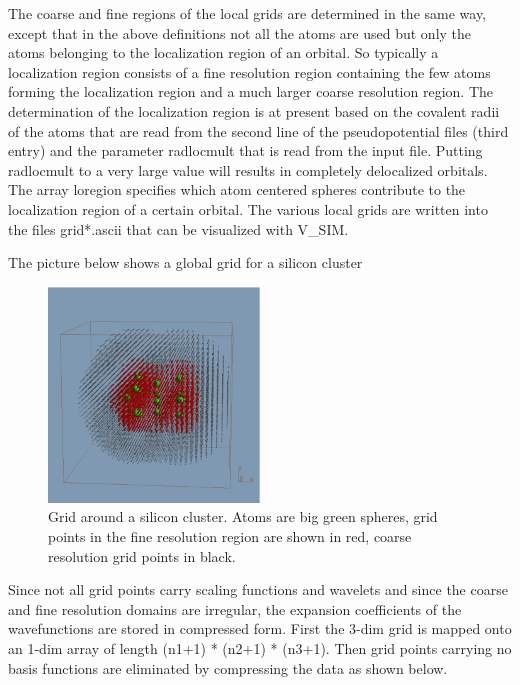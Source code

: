 \documentclass[12pt]{article}
\begin{document}
The coarse and fine regions of the local grids are determined in the same way, except 
that in the above definitions not all the atoms are used but only the atoms belonging 
to the localization region of an orbital. So typically a localization region 
consists of a fine resolution region containing the few atoms forming the localization 
region and a much larger coarse resolution region. The determination of the localization 
region is at present based on the covalent radii of the atoms that 
are read from the second line of the pseudopotential files (third entry) and the 
parameter { \color{red} radlocmult} that is read from the input file. Putting 
radlocmult to a very large value will results in completely delocalized orbitals.
The array { \color{red} loregion} specifies which atom centered spheres contribute 
to the localization region of a certain orbital.
The various local grids are written into the files { \color{red} grid*.ascii} 
that can be visualized with V\_SIM. 

The picture below shows a global grid for a silicon cluster

\vspace{3cm}
\begin{figure}[ht]             %
\begin{center}
\setlength{\unitlength}{1cm}
\includegraphics[width=0.5\textwidth]{figrid.pdf}
\caption{ \label{grid} Grid around a silicon cluster. Atoms are big green spheres, 
grid points in the fine resolution region are shown in red, coarse resolution grid points 
in black.}
\end{center}
\end{figure}

\pagebreak 

\noindent
Since not all grid points carry scaling functions and wavelets and since 
the coarse and fine resolution domains are irregular, the expansion 
coefficients of the wavefunctions are stored in compressed form. First the 
3-dim grid is mapped onto an 1-dim array of length (n1+1) * (n2+1) * (n3+1). Then grid points 
carrying no basis functions are eliminated by compressing the data as shown below.
\end{document}
